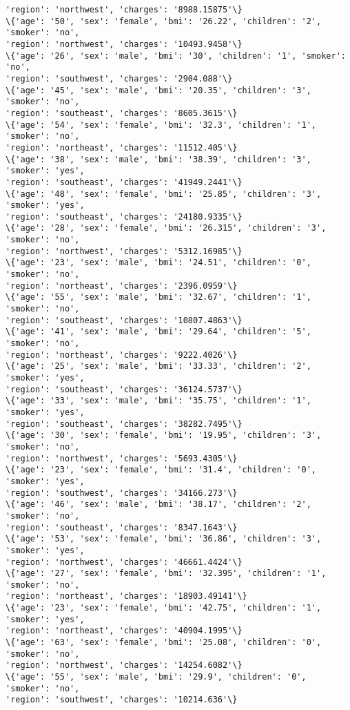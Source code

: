 \documentclass[11pt]{article}
\begin{document}
\begin{Verbatim}[commandchars=\\\{\}]
'region': 'northwest', 'charges': '8988.15875'\}
\{'age': '50', 'sex': 'female', 'bmi': '26.22', 'children': '2', 'smoker': 'no',
'region': 'northwest', 'charges': '10493.9458'\}
\{'age': '26', 'sex': 'male', 'bmi': '30', 'children': '1', 'smoker': 'no',
'region': 'southwest', 'charges': '2904.088'\}
\{'age': '45', 'sex': 'male', 'bmi': '20.35', 'children': '3', 'smoker': 'no',
'region': 'southeast', 'charges': '8605.3615'\}
\{'age': '54', 'sex': 'female', 'bmi': '32.3', 'children': '1', 'smoker': 'no',
'region': 'northeast', 'charges': '11512.405'\}
\{'age': '38', 'sex': 'male', 'bmi': '38.39', 'children': '3', 'smoker': 'yes',
'region': 'southeast', 'charges': '41949.2441'\}
\{'age': '48', 'sex': 'female', 'bmi': '25.85', 'children': '3', 'smoker': 'yes',
'region': 'southeast', 'charges': '24180.9335'\}
\{'age': '28', 'sex': 'female', 'bmi': '26.315', 'children': '3', 'smoker': 'no',
'region': 'northwest', 'charges': '5312.16985'\}
\{'age': '23', 'sex': 'male', 'bmi': '24.51', 'children': '0', 'smoker': 'no',
'region': 'northeast', 'charges': '2396.0959'\}
\{'age': '55', 'sex': 'male', 'bmi': '32.67', 'children': '1', 'smoker': 'no',
'region': 'southeast', 'charges': '10807.4863'\}
\{'age': '41', 'sex': 'male', 'bmi': '29.64', 'children': '5', 'smoker': 'no',
'region': 'northeast', 'charges': '9222.4026'\}
\{'age': '25', 'sex': 'male', 'bmi': '33.33', 'children': '2', 'smoker': 'yes',
'region': 'southeast', 'charges': '36124.5737'\}
\{'age': '33', 'sex': 'male', 'bmi': '35.75', 'children': '1', 'smoker': 'yes',
'region': 'southeast', 'charges': '38282.7495'\}
\{'age': '30', 'sex': 'female', 'bmi': '19.95', 'children': '3', 'smoker': 'no',
'region': 'northwest', 'charges': '5693.4305'\}
\{'age': '23', 'sex': 'female', 'bmi': '31.4', 'children': '0', 'smoker': 'yes',
'region': 'southwest', 'charges': '34166.273'\}
\{'age': '46', 'sex': 'male', 'bmi': '38.17', 'children': '2', 'smoker': 'no',
'region': 'southeast', 'charges': '8347.1643'\}
\{'age': '53', 'sex': 'female', 'bmi': '36.86', 'children': '3', 'smoker': 'yes',
'region': 'northwest', 'charges': '46661.4424'\}
\{'age': '27', 'sex': 'female', 'bmi': '32.395', 'children': '1', 'smoker': 'no',
'region': 'northeast', 'charges': '18903.49141'\}
\{'age': '23', 'sex': 'female', 'bmi': '42.75', 'children': '1', 'smoker': 'yes',
'region': 'northeast', 'charges': '40904.1995'\}
\{'age': '63', 'sex': 'female', 'bmi': '25.08', 'children': '0', 'smoker': 'no',
'region': 'northwest', 'charges': '14254.6082'\}
\{'age': '55', 'sex': 'male', 'bmi': '29.9', 'children': '0', 'smoker': 'no',
'region': 'southwest', 'charges': '10214.636'\}

\end{Verbatim}
\end{document}
